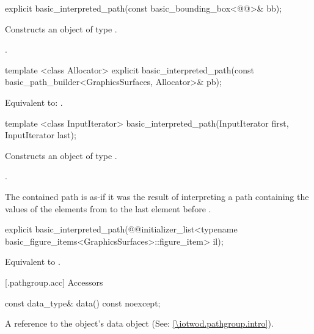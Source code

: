 %
\begin{itemdecl}
explicit basic_interpreted_path(const basic_bounding_box<@\graphicsmathtemplparamnospace{}@>& bb);
\end{itemdecl}
\begin{itemdescr}
\pnum
\effects
Constructs an object of type .

\pnum
\postconditions
{}.
\end{itemdescr}

%
\begin{itemdecl}
template <class Allocator>
explicit basic_interpreted_path(const basic_path_builder<GraphicsSurfaces, Allocator>& pb);
\end{itemdecl}
\begin{itemdescr}
\pnum
\effects
Equivalent to: .	
\end{itemdescr}

%
\begin{itemdecl}
template <class InputIterator>
basic_interpreted_path(InputIterator first, InputIterator last);
\end{itemdecl}
\begin{itemdescr}
\pnum
\effects
Constructs an object of type .

\pnum
\postconditions
{}.

\pnum
\begin{note}
The contained path is as-if it was the result of interpreting a path containing the values of the elements from  to the last element before .
\end{note}
\end{itemdescr}

%
\begin{itemdecl}
explicit basic_interpreted_path(@\stdqualifier{}@initializer_list<typename
  basic_figure_items<GraphicsSurfaces>::figure_item> il);
\end{itemdecl}
\begin{itemdescr}
\pnum
\effects
Equivalent to .
\end{itemdescr}

 [\iotwod.pathgroup.acc] {Accessors}

%
\begin{itemdecl}
const data_type& data() const noexcept;
\end{itemdecl}
\begin{itemdescr}
\pnum
\returns A reference to the  object's data object (See: \ref{\iotwod.pathgroup.intro}).
\end{itemdescr}